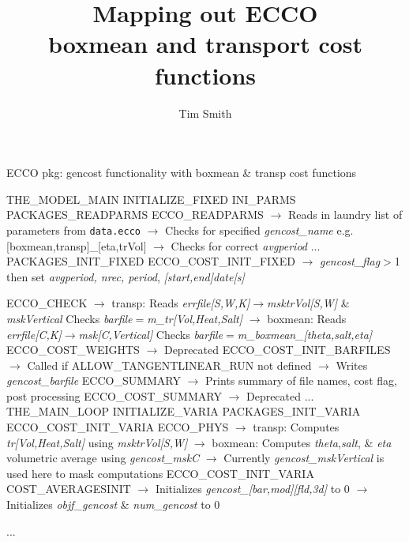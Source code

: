 \documentclass[a4paper,10pt]{article}
\title{\vspace{-8ex}Mapping out ECCO \\ boxmean and transport cost functions}
\author{Tim Smith}
\date{\vspace{-5ex}}
\newcommand{\ai}{\hspace{\algorithmicindent}}
\begin{document}
\maketitle

\begin{algorithm}
  \caption{ECCO pkg: gencost functionality with boxmean \& transp cost functions}
  \begin{algorithmic}
   \label{alg:ecco}
   \STATE
   \STATE THE\_MODEL\_MAIN
   \STATE\ai INITIALIZE\_FIXED
   \STATE\ai\ai INI\_PARMS
   \STATE\ai\ai\ai PACKAGES\_READPARMS
   \STATE\ai\ai\ai\ai ECCO\_READPARMS
   \STATE\ai\ai\ai\ai\ai $\rightarrow$ Reads in laundry list of parameters from \texttt{data.ecco}
   \STATE\ai\ai\ai\ai\ai $\rightarrow$ Checks for specified \textit{gencost\_name} e.g. [boxmean,transp]\_[eta,trVol]
   \STATE\ai\ai\ai\ai\ai $\rightarrow$ Checks for correct \textit{avgperiod}
   \STATE...
   \STATE\ai\ai PACKAGES\_INIT\_FIXED
   \STATE\ai\ai\ai ECCO\_COST\_INIT\_FIXED
   \STATE\ai\ai\ai\ai $\rightarrow$ \textit{gencost\_flag}$>$1 then set \textit{avgperiod, nrec, period}, \textit{[start,end]date[s]}
   
   \STATE\ai\ai\ai\ai ECCO\_CHECK
   \STATE\ai\ai\ai\ai\ai $\rightarrow$ transp: Reads \textit{errfile[S,W,K]}$\rightarrow$\textit{msktrVol[S,W]} \& \textit{mskVertical} 
   \STATE\ai\ai\ai\ai\ai\ai  Checks \textit{barfile}$=$\textit{m\_tr[Vol,Heat,Salt]}
   \STATE\ai\ai\ai\ai\ai $\rightarrow$ boxmean: Reads \textit{errfile[C,K]}$\rightarrow$\textit{msk[C,Vertical]}
   \STATE\ai\ai\ai\ai\ai\ai  Checks \textit{barfile}$=$\textit{m\_boxmean\_[theta,salt,eta]}
   \STATE\ai\ai\ai\ai ECCO\_COST\_WEIGHTS
   \STATE\ai\ai\ai\ai\ai $\rightarrow$ Deprecated
   \STATE\ai\ai\ai\ai ECCO\_COST\_INIT\_BARFILES
   \STATE\ai\ai\ai\ai\ai $\rightarrow$ Called if ALLOW\_TANGENTLINEAR\_RUN not defined
   \STATE\ai\ai\ai\ai\ai $\rightarrow$ Writes \textit{gencost\_barfile}
   \STATE\ai\ai\ai\ai ECCO\_SUMMARY
   \STATE\ai\ai\ai\ai\ai $\rightarrow$ Prints summary of file names, cost flag, post processing 
   \STATE\ai\ai\ai\ai ECCO\_COST\_SUMMARY
   \STATE\ai\ai\ai\ai\ai $\rightarrow$ Deprecated
   \STATE...
   \STATE\ai THE\_MAIN\_LOOP
   \STATE\ai\ai INITIALIZE\_VARIA
   \STATE\ai\ai\ai PACKAGES\_INIT\_VARIA
   \STATE\ai\ai\ai\ai ECCO\_COST\_INIT\_VARIA
   \STATE\ai\ai\ai\ai\ai ECCO\_PHYS
   \STATE\ai\ai\ai\ai\ai\ai $\rightarrow$ transp: Computes \textit{tr[Vol,Heat,Salt]} using \textit{msktrVol[S,W]}
   \STATE\ai\ai\ai\ai\ai\ai $\rightarrow$ boxmean: Computes \textit{theta},\textit{salt}, \& \textit{eta} volumetric average using \textit{gencost\_mskC} 
   \STATE\ai\ai\ai\ai\ai\ai $\rightarrow$ Currently \textit{gencost\_mskVertical} is used here to mask computations
   \STATE\ai\ai\ai\ai\ai ECCO\_COST\_INIT\_VARIA
   \STATE\ai\ai\ai\ai\ai\ai COST\_AVERAGESINIT
   \STATE\ai\ai\ai\ai\ai\ai\ai $\rightarrow$ Initializes \textit{gencost\_[bar,mod][fld,3d]} to 0
   \STATE\ai\ai\ai\ai\ai\ai $\rightarrow$ Initializes \textit{objf\_gencost} \& \textit{num\_gencost} to 0

   \STATE...
 \end{algorithmic}
\end{algorithm}
\end{document}
